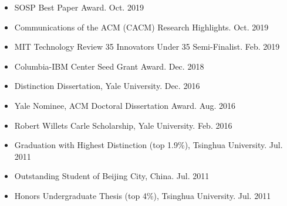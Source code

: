 \documentclass[10pt]{article}
\newenvironment{innerlist}[1][\enskip\textbullet]%
        {\begin{itemize}[#1,leftmargin=25pt,parsep=0pt,itemsep=2pt,topsep=2pt,partopsep=0pt]}
        {\end{itemize}}
\begin{document}
\begin{innerlist}

\item[] 
SOSP Best Paper Award.
\hfill{Oct. 2019}

 \vspace{0.05in}

\item[] 
Communications of the ACM (CACM) Research Highlights.
\hfill{Oct. 2019}

 \vspace{0.05in}

\item[] MIT Technology Review 35 Innovators Under 35 Semi-Finalist.  
\hfill{Feb. 2019}

\vspace{0.05in}

\item[] Columbia-IBM Center Seed Grant Award. \hfill{Dec. 2018}%
\vspace{0.05in}

\item[] Distinction Dissertation, Yale University. \hfill{Dec. 2016}

\vspace{0.05in}

\item[] Yale Nominee, ACM Doctoral Dissertation Award. \hfill{Aug. 2016}

\vspace{0.05in}

\item[] Robert Willets Carle Scholarship, Yale University. \hfill Feb. 2016

\vspace{0.05in}

\item[] Graduation with Highest Distinction (top 1.9\%), Tsinghua University. \hfill Jul. 2011

\vspace{0.05in}

\item[] Outstanding Student of Beijing City, China. \hfill Jul. 2011

\vspace{0.05in}

\item[] Honors Undergraduate Thesis (top 4\%), Tsinghua University. \hfill{Jul. 2011}

%
%
%
%
%
\end{innerlist}
\end{document}
